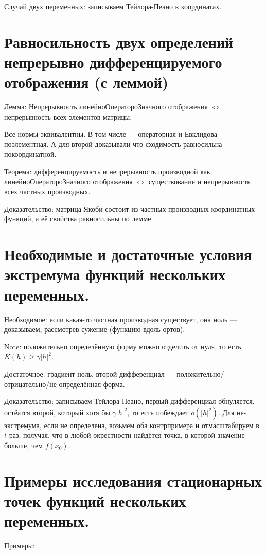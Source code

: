 \documentclass[12pt, a4paper]{article}
\begin{document}
Случай двух переменных: записываем Тейлора-Пеано в координатах.

\section{Равносильность двух определений непрерывно дифференцируемого отображения (с леммой)}

    Лемма: Непрерывность линейноОператороЗначного отображения $\Leftrightarrow$ непрерывность всех элементов матрицы.

    Все нормы эквивалентны. В том числе — операторная и Евклидова поэлементная. 
    А для второй доказывали что сходимость равносильна покоординатной.

    Теорема: дифференцируемость и непрерывность производной как линейноОператороЗначного отображения $\Leftrightarrow$
    существование и непрерывность всех частных производных.

    Доказательство: матрица Якоби состоит из частных производных координатных функций, а её свойства равносильны по лемме.


\section{Необходимые и достаточные условия экстремума функций нескольких переменных.}

    Необходимое: если какая-то частная производная существует, она ноль — доказываем, рассмотрев сужение (функцию вдоль ортов).

    Note: положительно определённую форму можно отделить от нуля, то есть $K(h) \geqslant \gamma |h|^2$.
    
    Достаточное: градиент ноль, второй дифференциал — положительно/отрицательно/не определённая форма.

    Доказательство: записываем Тейлора-Пеано, первый дифференциал обнуляется, остёатся второй, который хотя бы $\gamma |h|^2$, то есть побеждает $o(|h|^2)$.
    Для не-экстремума, если не определена, возьмём оба контрпримера и отмасштабируем в $t$ раз, получая, что в любой окрестности найдётся точка, в которой значение больше, чем $f(x_0)$.


\section{Примеры исследования стационарных точек функций нескольких переменных.}

    Примеры: 
\end{document}

